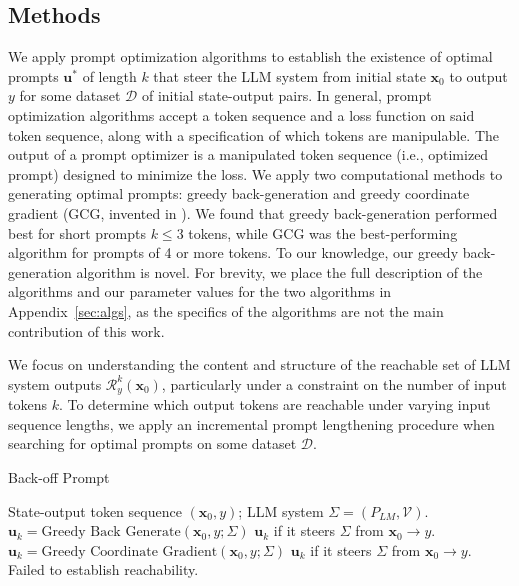 \documentclass{article} %
\begin{document}
\label{sec:experiments}
\subsection{Methods}
\label{sec:methods}

We apply prompt optimization algorithms to establish the existence of optimal prompts $\mathbf u^*$ of length $k$ that steer the LLM system from initial state $\mathbf x_0$ to output $y$ for some dataset $\mathcal D$ of initial state-output pairs. 
In general, prompt optimization algorithms accept a token sequence and a loss function on said token sequence, along with a specification of which tokens are manipulable. 
The output of a prompt optimizer is a manipulated token sequence (i.e., optimized prompt) designed to minimize the loss. 
We apply two computational methods to generating optimal prompts: greedy back-generation and greedy coordinate gradient (GCG, invented in \cite{zou2023universal}). 
We found that greedy back-generation performed best for short prompts $k\leq 3$ tokens, while GCG was the best-performing algorithm for prompts of 4 or more tokens. 
To our knowledge, our greedy back-generation algorithm is novel. 
For brevity, we place the full description of the algorithms and our parameter values for the two algorithms in Appendix~\ref{sec:algs}, as the specifics of the algorithms are not the main contribution of this work. 


We focus on understanding the content and structure of the reachable set of LLM system outputs $\mathcal R_y^k(\mathbf x_0)$, particularly under a constraint on the number of input tokens $k$. 
To determine which output tokens are reachable under varying input sequence lengths, we apply an incremental prompt lengthening procedure when searching for optimal prompts on some dataset $\mathcal D$. 

\begin{algorithm}
\caption{Back-off Prompt}
\label{alg:back-off-prompt}
\begin{algorithmic}[1]
\Require State-output token sequence $(\mathbf x_0, y)$; LLM system $\Sigma = (P_{LM}, \mathcal V)$.
    \State $\mathbf u_k = \text{Greedy Back Generate}(\mathbf x_0, y; \Sigma)$
    \State \Return $\mathbf u_k$ if it steers $\Sigma$ from $\mathbf x_0 \to y$.
\EndFor 
{}
    \State $\mathbf u_k = \text{Greedy Coordinate Gradient}(\mathbf x_0, y; \Sigma)$
    \State \Return $\mathbf u_k$ if it steers $\Sigma$ from $\mathbf x_0 \to y$.
\EndFor 
\State \Return Failed to establish reachability.
\end{algorithmic}
\end{algorithm}
\end{document}

